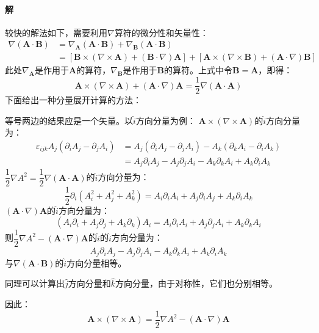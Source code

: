 \documentclass[fontset=none,openany,a4paper]{ctexbook}
\begin{document}
\begin{enumerate}
    \paragraph{解}

    较快的解法如下，需要利用$\nabla$算符的微分性和矢量性：
    \begin{align*}
        \nabla(\bm{A}\cdot\bm{B})
        &= \nabla_{\bm{A}}(\bm{A}\cdot\bm{B}) + \nabla_{\bm{B}}(\bm{A}\cdot\bm{B}) \\
        &= [\bm{B}\times(\nabla\times\bm{A}) + (\bm{B}\cdot\nabla)\bm{A}] + [\bm{A}\times(\nabla\times\bm{B}) + (\bm{A}\cdot\nabla)\bm{B}]
    \end{align*}
    此处$\nabla_{\bm{A}}$是作用于$\bm{A}$的算符，$\nabla_{\bm{B}}$是作用于$\bm{B}$的算符。上式中令$\bm{B}=\bm{A}$，即得：
    \[
    \bm{A}\times(\nabla\times\bm{A}) + (\bm{A}\cdot\nabla)\bm{A} = \frac{1}{2}\nabla(\bm{A}\cdot\bm{A})
    \]
    下面给出一种分量展开计算的方法：

    等号两边的结果应是一个矢量。以$\hat{i}$方向分量为例：
    $\bm{A}\times(\nabla\times\bm{A})$的$\hat{i}$方向分量为：
    \begin{align*}
        \varepsilon_{ijk}A_j(\partial_i A_j - \partial_j A_i)
        &= A_j(\partial_i A_j - \partial_j A_i) - A_k(\partial_k A_i - \partial_i A_k) \\
        &= A_j\partial_i A_j - A_j\partial_j A_i - A_k\partial_k A_i + A_k\partial_i A_k
    \end{align*}
    $\dfrac{1}{2}\nabla A^2 = \dfrac{1}{2}\nabla(\bm{A}\cdot\bm{A})$的$\hat{i}$方向分量为：
    \[
    \frac{1}{2}\partial_i (A_i^2 + A_j^2 + A_k^2) = A_i \partial_i A_i + A_j \partial_i A_j + A_k \partial_i A_k
    \]
    $(\bm{A}\cdot\nabla)\bm{A}$的$\hat{i}$方向分量为：
    \[
    (A_i\partial_i + A_j\partial_j + A_k\partial_k)A_i = A_i\partial_i A_i + A_j\partial_j A_i + A_k\partial_k A_i
    \]
    则$\dfrac{1}{2}\nabla A^2 - (\bm{A}\cdot\nabla)\bm{A}$的$\hat{i}$的$\hat{i}$方向分量为：
    \[
    A_j\partial_i A_j - A_j\partial_j A_i - A_k\partial_k A_i + A_k\partial_i A_k
    \]
    与$\nabla(\bm{A}\cdot\bm{B})$的$\hat{i}$方向分量相等。

    同理可以计算出$\hat{j}$方向分量和$\hat{k}$方向分量，由于对称性，它们也分别相等。

    因此：
    \[
    \bm{A}\times(\nabla\times\bm{A}) = \frac{1}{2}\nabla A^2 - (\bm{A}\cdot\nabla)\bm{A}
    \]

\end{enumerate}
\end{document}
